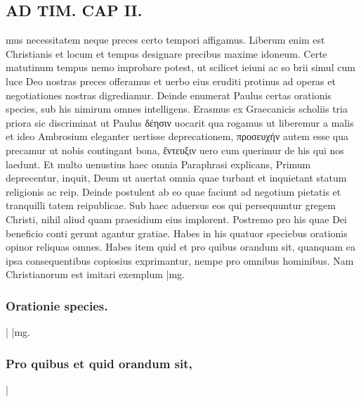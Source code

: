 \documentclass{article}
\begin{document}
\begin{pages}
\section*{AD TIM. CAP II. }
\marginpar{[ p.111 ]}\pstart mus necessitatem neque preces certo tempori affigamus. Liberum enim est Christianis et locum et tempus designare precibus maxime idoneum. Certe matutinum tempus nemo improbare potest, ut scilicet ieiuni ac so brii simul cum luce Deo nostras preces offeramus et uerbo eius eruditi protinus ad operas et negotiationes nostras digrediamur. Deinde enumerat Paulus certas orationis species, sub his nimirum omnes intelligens. Erasmus ex Graecanicis scholiis tria priora sic discriminat ut Paulus δέησιν uocarit qua rogamus ut liberemur a malis et ideo Ambrosium eleganter uertisse deprecationem, προσευχήν autem esse qua precamur ut nobis contingant bona, ἔντευξιν uero cum querimur de his qui nos laedunt. Et multo uenustius haec omnia Paraphrasi explicans, Primum deprecentur, inquit, Deum ut auertat omnia quae turbant et inquietant statum religionis ac reip. Deinde postulent ab eo quae faciunt ad negotium pietatis et tranquilli tatem reipublicae. Sub haec aduersus eos qui persequuntur gregem Christi, nihil aliud quam praesidium eius implorent. Postremo pro his quae Dei beneficio conti gerunt agantur gratiae. Habes in his quatuor speciebus orationis opinor reliquas omnes. Habes item quid et pro quibus orandum sit, quanquam ea ipsa consequentibus copiosius exprimantur, nempe pro omnibus hominibus. Nam Christianorum est imitari exemplum  \pend
|mg. \subsubsection*{Orationie species. }|
|mg. \subsubsection*{Pro quibus et quid orandum sit, }|

\end{pages}
\end{document}

